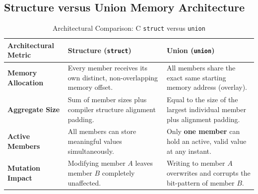 \subsection{Structure versus Union Memory Architecture}
\begin{table}[htbp]
\centering
\small
\begin{tabularx}{\textwidth}{l X X}
\toprule
\textbf{Architectural Metric} & \textbf{Structure (\texttt{struct})} & \textbf{Union (\texttt{union})} \\
\midrule
\textbf{Memory Allocation} & Every member receives its own distinct, non-overlapping memory offset. & All members share the exact same starting memory address (overlay). \\
\textbf{Aggregate Size} & Sum of member sizes plus compiler structure alignment padding. & Equal to the size of the largest individual member plus alignment padding. \\
\textbf{Active Members} & All members can store meaningful values simultaneously. & Only \textbf{one member} can hold an active, valid value at any instant. \\
\textbf{Mutation Impact} & Modifying member $A$ leaves member $B$ completely unaffected. & Writing to member $A$ overwrites and corrupts the bit-pattern of member $B$. \\
\bottomrule
\end{tabularx}
\caption{Architectural Comparison: C \texttt{struct} versus \texttt{union}}
\label{tab:struct_vs_union}
\end{table}

